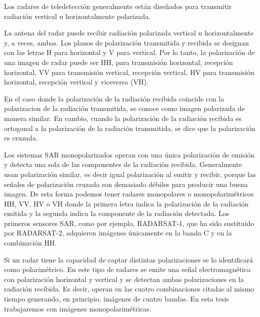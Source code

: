 Los radares de teledetección generalmente están diseñados para transmitir radiación vertical u horizontalmente polarizada. 

La antena del radar puede recibir radiación polarizada vertical u horizontalmente y, a veces, ambas. Los planos de polarización transmitida y recibida se designan con las letras H para horizontal y V para vertical. Por lo tanto, la polarización de una imagen de radar puede ser HH, para transmisión horizontal, recepción horizontal, VV para transmisión vertical, recepción vertical, HV para transmisión horizontal, recepción vertical y viceversa (VH).

En el caso donde la polarización de la radiación recibida coincide con la polarizacion de la radiación transmitida, se conoce como imagen polarizada de manera similar. En cambio, cuando la polarización de la radiación recibida es ortogonal a la polarización de la radiación transmitida, se dice que la polarización es cruzada.  

Los sistemas SAR monopolarizados operan con una única polarización de emisión y detecta una sola de las componentes de la radiación recibida. Generalmente usan polarización similar, es decir igual polarización al emitir y recibir,  porque las señales de polarización cruzada son demasiado débiles para producir una buena imagen. De esta forma podemos tener radares monopolares o monopolarimétricos HH, VV, HV o VH donde la primera letra indica la polarización de la radiación emitida y la segunda indica la componente de la radiación detectada. Los primeros sensores SAR, como por ejemplo,  RADARSAT-1, que ha sido sustituido por RADARSAT-2, adquieren imágenes únicamente en la banda C y en la combinación HH. 

Si un radar tiene la capacidad de captar distintas polarizaciones se lo identificará como polarimétrico. En este tipo de radares se emite una señal electromagnética con polarización horizontal y vertical y se detectan ambas polarizaciones en la radiación recibida. Es decir, operan en las cuatro combinaciones citadas al mismo tiempo generando, en principio, imágenes de cuatro bandas. En esta tesis trabajaremos con imágenes monopolarimétricas.

